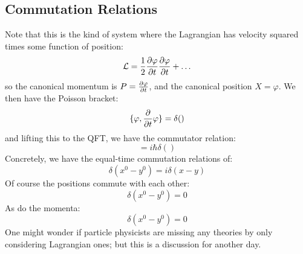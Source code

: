 \subsection{Commutation Relations}
Note that this is the kind of system where the Lagrangian has velocity squared times some function of position:
\begin{equation}
    \L = \frac{1}{2}\dpd{\varphi}{t}\dpd{\varphi}{t} + \ldots 
\end{equation}
so the canonical momentum is $P = \dpd{\varphi}{t}$, and the canonical position $X = \varphi$. We then have the Poisson bracket:
\begin{equation}
    \{\varphi, \dpd{}{t}\varphi\} = \delta()
\end{equation}
and lifting this to the QFT, we have the commutator relation:
\begin{equation}
    [\varphi(x), \dpd{}{t}\varphi] = i\hbar \delta()
\end{equation}
Concretely, we have the equal-time commutation relations of:
\begin{equation}
    [\varphi(x), \dpd{}{y^0}\varphi(y)]\delta(x^0 - y^0) = i\delta(x - y)
\end{equation}
Of course the positions commute with each other:
\begin{equation}
    [\varphi(x), \varphi(y)]\delta(x^0 - y^0) = 0
\end{equation}
As do the momenta:
\begin{equation}
    [\dpd{}{x^0}\varphi(x), \dpd{}{y^0}\varphi(y)]\delta(x^0 - y^0) = 0
\end{equation}
One might wonder if particle physicists are missing any theories by only considering Lagrangian ones; but this is a discussion for another day.

